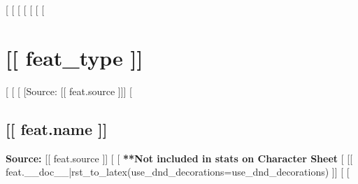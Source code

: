 [%
  [%
[%
  [%
[%
[%
  [%
    \section*{[[ feat_type ]]}
  [%
  [%
    [%
      [Source: [[ feat.source ]]]
    [%
      \subsection*{[[ feat.name ]]}
      \textbf{Source:} [[ feat.source ]]
    [%
    [%
      \textbf{**Not included in stats on Character Sheet}
    [%
    [[ feat.__doc__|rst_to_latex(use_dnd_decorations=use_dnd_decorations) ]]
  [%
[%
